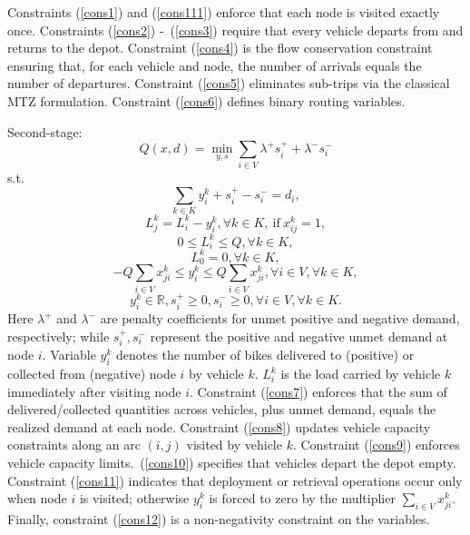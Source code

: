 \documentclass[preprint,12pt,authoryear]{elsarticle}
\begin{document}
Constraints (\ref{cons1}) and (\ref{cons111}) enforce that each node is visited exactly once. Constraints (\ref{cons2}) -~(\ref{cons3}) require that every vehicle departs from and returns to the depot. Constraint (\ref{cons4}) is the flow conservation constraint ensuring that, for each vehicle and node, the number of arrivals equals the number of departures. Constraint (\ref{cons5}) eliminates sub-trips via the classical MTZ formulation. Constraint (\ref{cons6}) defines binary routing variables.

Second-stage:
\begin{equation}\label{ques2}
    Q(x,d)=\min_{y,s} \sum_{i\in V}\lambda^+s_i^+ +\lambda^-s_i^- 
\end{equation}s.t. 
\begin{equation}\label{cons7}
    \sum_{k\in K}y_i^{k}+s_i^+ - s_i^- =d_i,
\end{equation}
\begin{equation}\label{cons8}
    L_j^k=L_i^k-y_i^{k}, \forall k\in K,~\text{if}~ x_{ij}^k=1,
\end{equation}
\begin{equation}\label{cons9}
    0\leq L_i^k\leq Q, \forall k\in K,
\end{equation}
\begin{equation}\label{cons10}
    L_0^k= 0, \forall k\in K,
\end{equation}
\begin{equation}\label{cons11}
    -Q\sum_{i\in V}x_{ji}^k\leq y_i^{k}\leq Q \sum_{i\in V}x_{ji}^k,\forall i\in V,\forall k\in K,
\end{equation}
\begin{equation}\label{cons12}
    y_i^{k}\in \mathbb{R} , s_i^+ \geq 0, s_i^-\geq 0, \forall i\in V,\forall k\in K.
\end{equation}
Here $\lambda^+$ and $\lambda^-$ are penalty coefficients for unmet positive and negative demand, respectively; while $s_i^+,s_i^-$ represent the positive and negative unmet demand at node $i$. Variable $y_i^k$ denotes the number of bikes delivered to (positive) or collected from (negative) node $i$ by vehicle $k$. $L_i^k$ is the load carried by vehicle $k$ immediately after visiting node $i$. Constraint (\ref{cons7}) enforces that the sum of delivered/collected quantities across vehicles, plus unmet demand, equals the realized demand at each node. Constraint (\ref{cons8}) updates vehicle capacity constraints along an arc $(i,j)$ visited by vehicle $k$. Constraint (\ref{cons9}) enforces vehicle capacity limits.~(\ref{cons10}) specifies that vehicles depart the depot empty. Constraint (\ref{cons11}) indicates that deployment or retrieval operations occur only when node $i$ is visited; otherwise $y_i^k$ is forced to zero by the multiplier $\sum_{i\in V} x_{ji}^k$. Finally, constraint (\ref{cons12}) is a non-negativity constraint on the variables.
\end{document}
